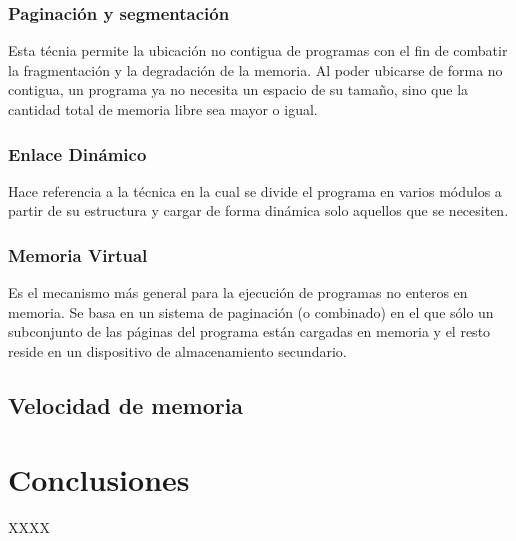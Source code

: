 \documentclass{article}
\begin{document}
\subsubsection{Paginación y segmentación}
Esta técnia permite la ubicación no contigua de programas con el fin de combatir la fragmentación y la degradación de la memoria. Al poder ubicarse de forma no contigua, un programa ya no necesita un espacio de su tamaño, sino que la cantidad total de memoria libre sea mayor o igual.

\subsubsection{Enlace Dinámico}
Hace referencia a la técnica en la cual se divide el programa en varios módulos a partir de su estructura y cargar de forma dinámica solo aquellos que se necesiten.
\subsubsection{Memoria Virtual}
Es el mecanismo más general para la ejecución de programas no enteros en memoria. Se basa en un sistema de paginación (o combinado) en el que sólo un subconjunto de las páginas del programa están cargadas en memoria y el resto reside en un dispositivo de almacenamiento secundario.

\subsection{Velocidad de memoria}


\section{Conclusiones} \label{conclusion}
XXXX



\end{document}
